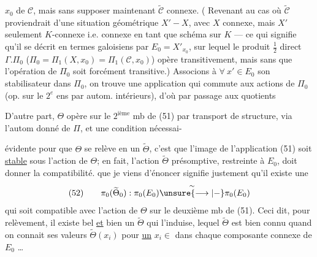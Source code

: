 $x_0$ de $\mathcal C$, mais sans supposer maintenant $\widetilde{\mathcal C}$ connexe. ( Revenant au cas où $\widetilde{\mathcal C}$ proviendrait d'une situation géométrique $X'\mathbin{-}X$, avec $X$ connexe,  mais $X'$ seulement $K$-connexe i.e. connexe en tant que schéma sur $K$ --- ce qui signifie qu'il  se décrit en termes galoisiens par $E_0=X'_{x_0}$, sur lequel le produit $\frac12$ direct $\Gamma.\Pi_0$ ($\Pi_0=\Pi_1(X,x_0)=\Pi_1(\mathcal C,x_0)$) opère transitivement, mais sans que l'opération de $\Pi_0$ soit forcément transitive.) Associons à $\forall\ x'\in E_0$ son stabilisateur dans $\Pi_0$, on trouve une application
qui commute aux actions de $\Pi_0$ (op. sur le $2^e$ ens par autom. intérieurs), d'où par passage aux quotients

D'autre part, $\Theta$ opère sur le $2^{\text{ième}}$ mb de (51) par transport de structure, via l'autom donné de $\Pi$, et  une condition nécessai-

évidente pour que $\Theta$ se relève en un $\widetilde{\Theta}$, c'est que l'image de l'application (51) soit \uline{stable} sous l'action de $\Theta$; en fait, l'action $\widetilde{\Theta}$ présomptive, restreinte à $E_0$, doit donner la compatibilité.     que je viens d'énoncer signifie justement qu'il existe une  
\[
(52)\qquad \pi_0(\widetilde{\Theta}_0):\pi_0(E_0)\overset{\sim}{\unsure{\longrightarrow|\mathbin{-}}}\pi_0(E_0)
\]
 qui soit compatible avec l'action de $\Theta$ sur le deuxième mb de (51). Ceci dit, pour  relèvement, il existe bel  \uline{et} bien un $\widetilde{\Theta}$ qui l'induise,  lequel $\widetilde{\Theta}$ est bien connu quand on connait ses valeurs $\widetilde{\Theta}(x_i)$  pour \uline{un} $x_i\in$   dans chaque composante connexe de $E_0$ \ldots

